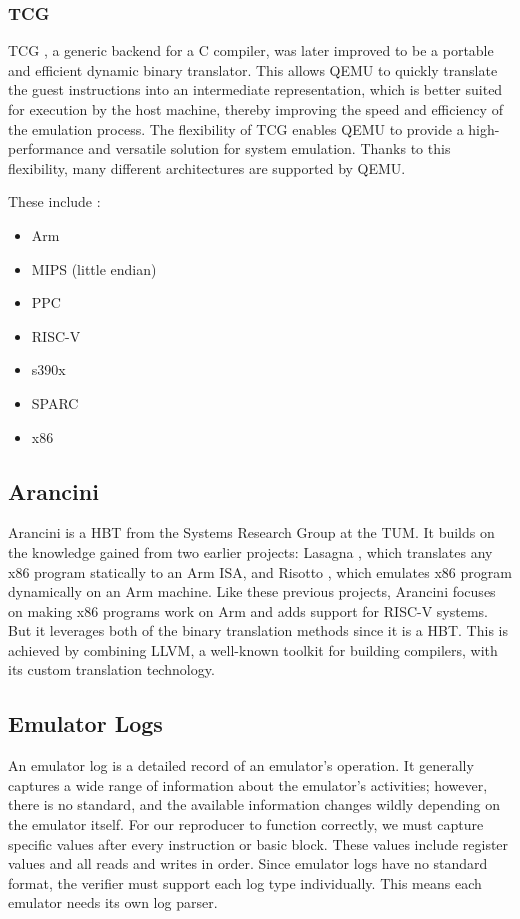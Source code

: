 \subsubsection{TCG}
\ac{TCG} \cite{qemu_tcg}, a generic backend for a C compiler, was later improved to be a portable and efficient dynamic binary translator.
This allows \ac{QEMU} to quickly translate the guest instructions into an intermediate representation, which is better suited for execution by the host machine, thereby improving the speed and efficiency of the emulation process.
The flexibility of \ac{TCG} enables \ac{QEMU} to provide a high-performance and versatile solution for system emulation.
Thanks to this flexibility, many different architectures are supported by \ac{QEMU}.

These include \cite{qemu_arch}:
\begin{itemize}
    \item Arm
    \item MIPS (little endian)
    \item PPC
    \item RISC-V
    \item s390x
    \item SPARC
    \item x86
\end{itemize}

\subsection{Arancini}
Arancini is a \ac{HBT} from the Systems Research Group at the \ac{TUM}.
It builds on the knowledge gained from two earlier projects: Lasagna \cite{rocha2022lasagne}, which translates any x86 program statically to an Arm \ac{ISA}, and Risotto \cite{gouicem2022risotto}, which emulates x86 program dynamically on an Arm machine.
Like these previous projects, Arancini focuses on making x86 programs work on Arm and adds support for RISC-V systems.
But it leverages both of the binary translation methods since it is a \ac{HBT}.
This is achieved by combining LLVM, a well-known toolkit for building compilers, with its custom translation technology.

\subsection{Emulator Logs}
An emulator log is a detailed record of an emulator's operation.
It generally captures a wide range of information about the emulator's activities; however, there is no standard, and the available information changes wildly depending on the emulator itself.
For our reproducer to function correctly, we must capture specific values after every instruction or basic block.
These values include register values and all reads and writes in order.
Since emulator logs have no standard format, the verifier must support each log type individually.
This means each emulator needs its own log parser.

